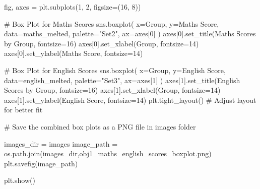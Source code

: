 \documentclass[
  letterpaper,
  DIV=11,
  numbers=noendperiod]{scrartcl}
\newenvironment{Shaded}{\begin{snugshade}}{\end{snugshade}}
\newcommand{\CommentTok}[1]{\textcolor[rgb]{0.37,0.37,0.37}{#1}}
\newcommand{\DecValTok}[1]{\textcolor[rgb]{0.68,0.00,0.00}{#1}}
\newcommand{\NormalTok}[1]{\textcolor[rgb]{0.00,0.23,0.31}{#1}}
\newcommand{\OperatorTok}[1]{\textcolor[rgb]{0.37,0.37,0.37}{#1}}
\newcommand{\StringTok}[1]{\textcolor[rgb]{0.13,0.47,0.30}{#1}}
\begin{document}
\begin{Shaded}
\begin{Highlighting}[]
\NormalTok{fig, axes }\OperatorTok{=}\NormalTok{ plt.subplots(}\DecValTok{1}\NormalTok{, }\DecValTok{2}\NormalTok{, figsize}\OperatorTok{=}\NormalTok{(}\DecValTok{16}\NormalTok{, }\DecValTok{8}\NormalTok{))}

\CommentTok{\# Box Plot for Maths Scores}
\NormalTok{sns.boxplot(}
\NormalTok{    x}\OperatorTok{=}\StringTok{\textquotesingle{}Group\textquotesingle{}}\NormalTok{,}
\NormalTok{    y}\OperatorTok{=}\StringTok{\textquotesingle{}Maths Score\textquotesingle{}}\NormalTok{,}
\NormalTok{    data}\OperatorTok{=}\NormalTok{maths\_melted,}
\NormalTok{    palette}\OperatorTok{=}\StringTok{"Set2"}\NormalTok{,}
\NormalTok{    ax}\OperatorTok{=}\NormalTok{axes[}\DecValTok{0}\NormalTok{]}
\NormalTok{)}
\NormalTok{axes[}\DecValTok{0}\NormalTok{].set\_title(}\StringTok{\textquotesingle{}Maths Scores by Group\textquotesingle{}}\NormalTok{, fontsize}\OperatorTok{=}\DecValTok{16}\NormalTok{)}
\NormalTok{axes[}\DecValTok{0}\NormalTok{].set\_xlabel(}\StringTok{\textquotesingle{}Group\textquotesingle{}}\NormalTok{, fontsize}\OperatorTok{=}\DecValTok{14}\NormalTok{)}
\NormalTok{axes[}\DecValTok{0}\NormalTok{].set\_ylabel(}\StringTok{\textquotesingle{}Maths Score\textquotesingle{}}\NormalTok{, fontsize}\OperatorTok{=}\DecValTok{14}\NormalTok{)}


\CommentTok{\# Box Plot for English Scores}
\NormalTok{sns.boxplot(}
\NormalTok{    x}\OperatorTok{=}\StringTok{\textquotesingle{}Group\textquotesingle{}}\NormalTok{,}
\NormalTok{    y}\OperatorTok{=}\StringTok{\textquotesingle{}English Score\textquotesingle{}}\NormalTok{,}
\NormalTok{    data}\OperatorTok{=}\NormalTok{english\_melted,}
\NormalTok{    palette}\OperatorTok{=}\StringTok{"Set3"}\NormalTok{,}
\NormalTok{    ax}\OperatorTok{=}\NormalTok{axes[}\DecValTok{1}\NormalTok{]}
\NormalTok{)}
\NormalTok{axes[}\DecValTok{1}\NormalTok{].set\_title(}\StringTok{\textquotesingle{}English Scores by Group\textquotesingle{}}\NormalTok{, fontsize}\OperatorTok{=}\DecValTok{16}\NormalTok{)}
\NormalTok{axes[}\DecValTok{1}\NormalTok{].set\_xlabel(}\StringTok{\textquotesingle{}Group\textquotesingle{}}\NormalTok{, fontsize}\OperatorTok{=}\DecValTok{14}\NormalTok{)}
\NormalTok{axes[}\DecValTok{1}\NormalTok{].set\_ylabel(}\StringTok{\textquotesingle{}English Score\textquotesingle{}}\NormalTok{, fontsize}\OperatorTok{=}\DecValTok{14}\NormalTok{)}
\NormalTok{plt.tight\_layout() }\CommentTok{\# Adjust layout for better fit}

\CommentTok{\# Save the combined box plots as a PNG file in images folder }

\NormalTok{images\_dir }\OperatorTok{=} \StringTok{\textquotesingle{}images\textquotesingle{}}
\NormalTok{image\_path }\OperatorTok{=}\NormalTok{ os.path.join(images\_dir,}\StringTok{\textquotesingle{}obj1\_maths\_english\_scores\_boxplot.png\textquotesingle{}}\NormalTok{)}
\NormalTok{plt.savefig(image\_path)}


\NormalTok{plt.show()}
\end{Highlighting}
\end{Shaded}
\end{document}
